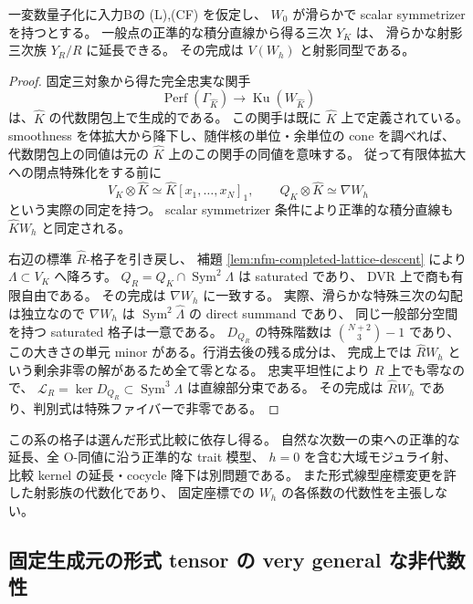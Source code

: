 \begin{corollary}
\label{cor:nfm-residual-good-reduction}
一変数量子化に入力Bの (L),(CF) を仮定し、
$W_0$ が滑らかで scalar symmetrizer を持つとする。
一般点の正準的な積分直線から得る三次 $Y_K$ は、
滑らかな射影三次族 $Y_R/R$ に延長できる。
その完成は $V(W_h)$ と射影同型である。
\end{corollary}
\begin{proof}
固定三対象から得た完全忠実な関手
\[
 \operatorname{Perf}(\Gamma_{\widehat K})
 \longrightarrow\operatorname{Ku}(W_{\widehat K})
\]
は、$\widehat K$ の代数閉包上で生成的である。
この関手は既に $\widehat K$ 上で定義されている。
smoothness を体拡大から降下し、随伴核の単位・余単位の cone を調べれば、
代数閉包上の同値は元の $\widehat K$ 上のこの関手の同値を意味する。
従って有限体拡大への閉点特殊化をする前に
\[
 V_K\otimes\widehat K\simeq
 \widehat K[x_1,\ldots,x_N]_1,\qquad
 Q_K\otimes\widehat K\simeq\nabla W_h
\]
という実際の同定を持つ。
scalar symmetrizer 条件により正準的な積分直線も
$\widehat K W_h$ と同定される。

右辺の標準 $\widehat R$-格子を引き戻し、
補題 \ref{lem:nfm-completed-lattice-descent} により $\Lambda\subset V_K$ へ降ろす。
$Q_R=Q_K\cap\operatorname{Sym}^2\Lambda$ は saturated であり、
DVR 上で商も有限自由である。
その完成は $\nabla W_h$ に一致する。
実際、滑らかな特殊三次の勾配は独立なので
$\nabla W_h$ は $\operatorname{Sym}^2\widehat\Lambda$ の direct summand であり、
同じ一般部分空間を持つ saturated 格子は一意である。
$D_{Q_R}$ の特殊階数は $\binom{N+2}{3}-1$ であり、
この大きさの単元 minor がある。行消去後の残る成分は、
完成上では $\widehat R W_h$ という剰余非零の解があるため全て零となる。
忠実平坦性により $R$ 上でも零なので、
$\mathcal L_R=\ker D_{Q_R}\subset\operatorname{Sym}^3\Lambda$ は直線部分束である。
その完成は $\widehat R W_h$ であり、判別式は特殊ファイバーで非零である。
\end{proof}

この系の格子は選んだ形式比較に依存し得る。
自然な次数一の束への正準的な延長、全 O-同値に沿う正準的な trait 模型、
$h=0$ を含む大域モジュライ射、比較 kernel の延長・cocycle 降下は別問題である。
また形式線型座標変更を許した射影族の代数化であり、
固定座標での $W_h$ の各係数の代数性を主張しない。


\subsection{固定生成元の形式 tensor の very general な非代数性}

